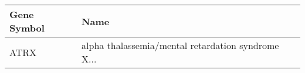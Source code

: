 \begin{tabular}{ll}
\toprule
Gene Symbol &                                               Name \\
\midrule
       ATRX & alpha thalassemia/mental retardation syndrome X... \\
\bottomrule
\end{tabular}
